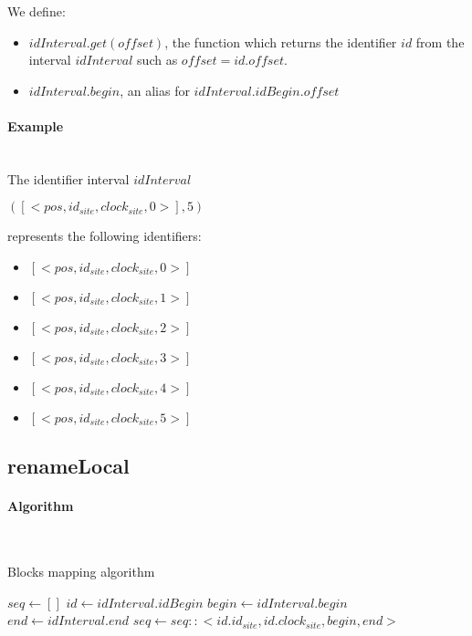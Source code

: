 \documentclass[a4paper]{article}
\begin{document}
We define:
\begin{itemize}
  \item $idInterval.get(offset)$, the function which returns the identifier $id$
    from the interval $idInterval$ such as $offset = id.offset$.
  \item $idInterval.begin$, an alias for $idInterval.idBegin.offset$
\end{itemize}

\paragraph{Example}~\\

The identifier interval $idInterval$
\begin{center}
  $([<pos, id_{site}, clock_{site}, 0>], 5)$
\end{center}
represents the following identifiers:
\begin{itemize}
  \item $[<pos, id_{site}, clock_{site}, 0>]$
  \item $[<pos, id_{site}, clock_{site}, 1>]$
  \item $[<pos, id_{site}, clock_{site}, 2>]$
  \item $[<pos, id_{site}, clock_{site}, 3>]$
  \item $[<pos, id_{site}, clock_{site}, 4>]$
  \item $[<pos, id_{site}, clock_{site}, 5>]$
\end{itemize}

\subsection{renameLocal}

\paragraph{Algorithm}~\\

\begin{algorithm}
  \caption{Blocks mapping algorithm}
  \label{alg:block-mapping}
  \begin{algorithmic}
      \State $seq \gets []$
        \State $id \gets idInterval.idBegin$
        \State $begin \gets idInterval.begin$
        \State $end \gets idInterval.end$
        \State $seq \gets seq :: <id.id_{site}, id.clock_{site}, begin, end>$
      \EndFor
    \EndFunction
  \end{algorithmic}
\end{algorithm}
\end{document}

